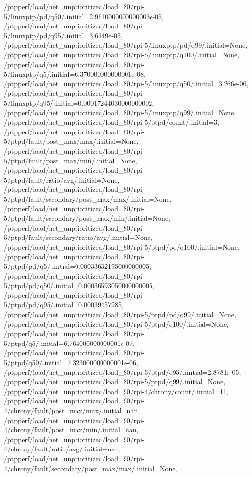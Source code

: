 {    /ptpperf/load/net_unprioritized/load_80/rpi-5/linuxptp/pd/q50/.initial=2.9610000000000003e-05,
    /ptpperf/load/net_unprioritized/load_80/rpi-5/linuxptp/pd/q95/.initial=3.6149e-05,
    /ptpperf/load/net_unprioritized/load_80/rpi-5/linuxptp/pd/q99/.initial=None,
    /ptpperf/load/net_unprioritized/load_80/rpi-5/linuxptp/q100/.initial=None,
    /ptpperf/load/net_unprioritized/load_80/rpi-5/linuxptp/q5/.initial=6.370000000000001e-08,
    /ptpperf/load/net_unprioritized/load_80/rpi-5/linuxptp/q50/.initial=3.266e-06,
    /ptpperf/load/net_unprioritized/load_80/rpi-5/linuxptp/q95/.initial=0.00017244030000000002,
    /ptpperf/load/net_unprioritized/load_80/rpi-5/linuxptp/q99/.initial=None,
    /ptpperf/load/net_unprioritized/load_80/rpi-5/ptpd/count/.initial=3,
    /ptpperf/load/net_unprioritized/load_80/rpi-5/ptpd/fault/post_max/max/.initial=None,
    /ptpperf/load/net_unprioritized/load_80/rpi-5/ptpd/fault/post_max/min/.initial=None,
    /ptpperf/load/net_unprioritized/load_80/rpi-5/ptpd/fault/ratio/avg/.initial=None,
    /ptpperf/load/net_unprioritized/load_80/rpi-5/ptpd/fault/secondary/post_max/max/.initial=None,
    /ptpperf/load/net_unprioritized/load_80/rpi-5/ptpd/fault/secondary/post_max/min/.initial=None,
    /ptpperf/load/net_unprioritized/load_80/rpi-5/ptpd/fault/secondary/ratio/avg/.initial=None,
    /ptpperf/load/net_unprioritized/load_80/rpi-5/ptpd/pd/q100/.initial=None,
    /ptpperf/load/net_unprioritized/load_80/rpi-5/ptpd/pd/q5/.initial=0.00033632195000000005,
    /ptpperf/load/net_unprioritized/load_80/rpi-5/ptpd/pd/q50/.initial=0.00036593050000000005,
    /ptpperf/load/net_unprioritized/load_80/rpi-5/ptpd/pd/q95/.initial=0.00039457985,
    /ptpperf/load/net_unprioritized/load_80/rpi-5/ptpd/pd/q99/.initial=None,
    /ptpperf/load/net_unprioritized/load_80/rpi-5/ptpd/q100/.initial=None,
    /ptpperf/load/net_unprioritized/load_80/rpi-5/ptpd/q5/.initial=6.764000000000001e-07,
    /ptpperf/load/net_unprioritized/load_80/rpi-5/ptpd/q50/.initial=7.323000000000001e-06,
    /ptpperf/load/net_unprioritized/load_80/rpi-5/ptpd/q95/.initial=2.8781e-05,
    /ptpperf/load/net_unprioritized/load_80/rpi-5/ptpd/q99/.initial=None,
    /ptpperf/load/net_unprioritized/load_90/rpi-4/chrony/count/.initial=11,
    /ptpperf/load/net_unprioritized/load_90/rpi-4/chrony/fault/post_max/max/.initial=nan,
    /ptpperf/load/net_unprioritized/load_90/rpi-4/chrony/fault/post_max/min/.initial=nan,
    /ptpperf/load/net_unprioritized/load_90/rpi-4/chrony/fault/ratio/avg/.initial=nan,
    /ptpperf/load/net_unprioritized/load_90/rpi-4/chrony/fault/secondary/post_max/max/.initial=None,
}
